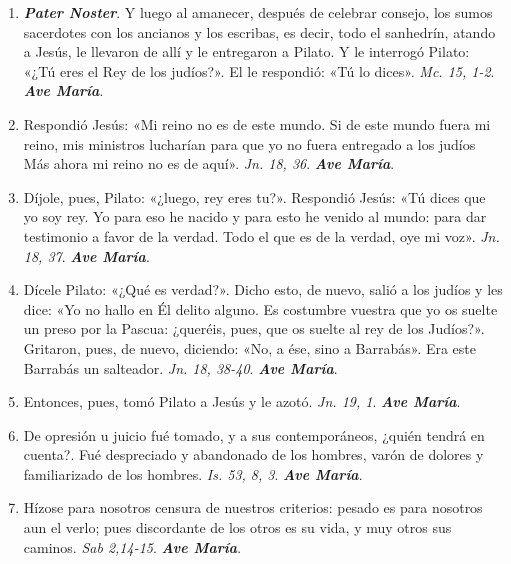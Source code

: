 \documentclass[../../devocionario.tex]{subfiles}
\begin{document}
    \begin{enumerate}
    
        \item \textbf{\textit{Pater Noster}}. Y luego al amanecer, después de celebrar consejo, los sumos sacerdotes con los ancianos y los escribas, 
            es decir, todo el sanhedrín, atando a Jesús, le llevaron de allí y le entregaron a Pilato. 
            Y le interrogó Pilato: «¿Tú eres el Rey de los judíos?». El le respondió: «Tú lo dices». \textit{Mc. 15, 1-2}. \textbf{\textit{Ave María}}.

        \item Respondió Jesús: «Mi reino no es de este mundo. Si de este mundo fuera mi reino, mis ministros lucharían para 
            que yo no fuera entregado a los judíos Más ahora mi reino no es de aquí». \textit{Jn. 18, 36}. \textbf{\textit{Ave María}}.

        \item Díjole, pues, Pilato: «¿luego, rey eres tu?». Respondió Jesús: «Tú dices que yo soy rey. Yo para eso he nacido y 
            para esto he venido al mundo: para dar testimonio a favor de la verdad. 
            Todo el que es de la verdad, oye mi voz». \textit{Jn. 18, 37}. \textbf{\textit{Ave María}}.

        \item Dícele Pilato: «¿Qué es verdad?». Dicho esto, de nuevo, salió a los judíos y les dice: 
            «Yo no hallo en Él delito alguno. Es costumbre vuestra que yo os suelte un preso por la Pascua: ¿queréis, pues, 
            que os suelte al rey de los Judíos?». Gritaron, pues, de nuevo, diciendo: «No, a ése, sino a Barrabás». 
            Era este Barrabás un salteador. \textit{Jn. 18, 38-40}. \textbf{\textit{Ave María}}.

        \item Entonces, pues, tomó Pilato a Jesús y le azotó. \textit{Jn. 19, 1}. \textbf{\textit{Ave María}}.

        \item De opresión u juicio fué tomado, y a sus contemporáneos, ¿quién tendrá en cuenta?. Fué despreciado y abandonado de los hombres, 
            varón de dolores y familiarizado de los hombres. \textit{Is. 53, 8, 3}. \textbf{\textit{Ave María}}.

        \item Hízose para nosotros censura de nuestros criterios: pesado es para nosotros aun el verlo; 
            pues discordante de los otros es su vida, y muy otros sus caminos. \textit{Sab 2,14-15}. \textbf{\textit{Ave María}}.


\end{enumerate}
\end{document}

